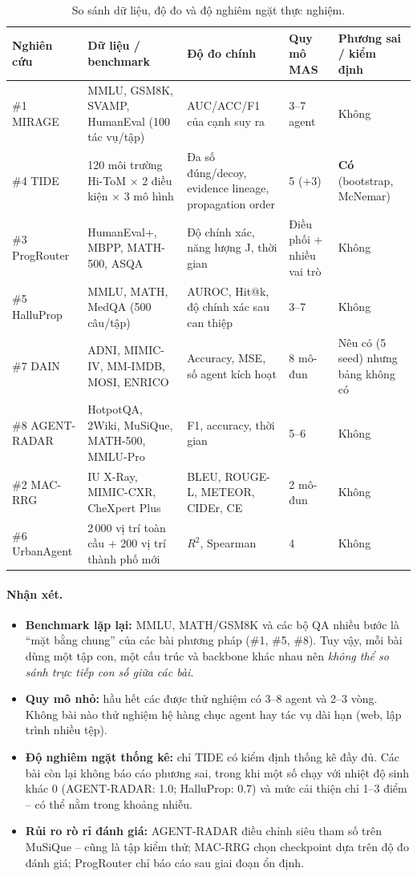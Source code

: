 \begin{table}[!htbp]
\centering
\footnotesize
\caption{So sánh dữ liệu, độ đo và độ nghiêm ngặt thực nghiệm.}
\label{tab:cmp-data}
\begin{tabularx}{\textwidth}{L{1.9cm} Y L{2.6cm} C{1.3cm} C{1.9cm}}
\toprule
\textbf{Nghiên cứu} & \textbf{Dữ liệu / benchmark} & \textbf{Độ đo chính} & \textbf{Quy mô MAS} & \textbf{Phương sai / kiểm định} \\
\midrule
\#1 MIRAGE & MMLU, GSM8K, SVAMP, HumanEval (100 tác vụ/tập) & AUC/ACC/F1 của cạnh suy ra & 3--7 agent & Không \\
\#4 TIDE & 120 môi trường Hi-ToM $\times$ 2 điều kiện $\times$ 3 mô hình & Đa số đúng/decoy, evidence lineage, propagation order & 5 (+3) & \textbf{Có} (bootstrap, McNemar) \\
\#3 ProgRouter & HumanEval+, MBPP, MATH-500, ASQA & Độ chính xác, năng lượng J, thời gian & Điều phối + nhiều vai trò & Không \\
\#5 HalluProp & MMLU, MATH, MedQA (500 câu/tập) & AUROC, Hit@k, độ chính xác sau can thiệp & 3--7 & Không \\
\#7 DAIN & ADNI, MIMIC-IV, MM-IMDB, MOSI, ENRICO & Accuracy, MSE, số agent kích hoạt & 8 mô-đun & Nêu có (5 seed) nhưng bảng không có \\
\#8 AGENT-RADAR & HotpotQA, 2Wiki, MuSiQue, MATH-500, MMLU-Pro & F1, accuracy, thời gian & 5--6 & Không \\
\#2 MAC-RRG & IU X-Ray, MIMIC-CXR, CheXpert Plus & BLEU, ROUGE-L, METEOR, CIDEr, CE & 2 mô-đun & Không \\
\#6 UrbanAgent & 2\,000 vị trí toàn cầu + 200 vị trí thành phố mới & $R^2$, Spearman & 4 & Không \\
\bottomrule
\end{tabularx}
\end{table}

\paragraph{Nhận xét.}
\begin{itemize}
  \item \textbf{Benchmark lặp lại:} MMLU, MATH/GSM8K và các bộ QA nhiều bước là ``mặt bằng chung'' của các bài phương pháp (\#1, \#5, \#8). Tuy vậy, mỗi bài dùng một tập con, một cấu trúc và backbone khác nhau nên \emph{không thể so sánh trực tiếp con số giữa các bài}.
  \item \textbf{Quy mô nhỏ:} hầu hết các \MAS{} được thử nghiệm có 3--8 agent và 2--3 vòng. Không bài nào thử nghiệm hệ hàng chục agent hay tác vụ dài hạn (web, lập trình nhiều tệp).
  \item \textbf{Độ nghiêm ngặt thống kê:} chỉ TIDE có kiểm định thống kê đầy đủ. Các bài còn lại không báo cáo phương sai, trong khi một số chạy với nhiệt độ sinh khác 0 (AGENT-RADAR: 1.0; HalluProp: 0.7) và mức cải thiện chỉ 1--3 điểm -- có thể nằm trong khoảng nhiễu.
  \item \textbf{Rủi ro rò rỉ đánh giá:} AGENT-RADAR điều chỉnh siêu tham số trên MuSiQue -- cũng là tập kiểm thử; MAC-RRG chọn checkpoint dựa trên độ đo đánh giá; ProgRouter chỉ báo cáo sau giai đoạn ổn định.
\end{itemize}

